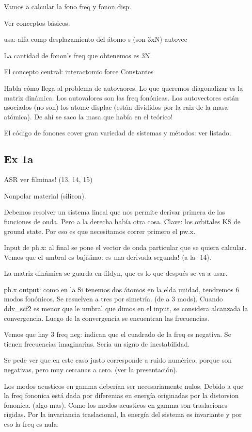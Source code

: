     Vamos a calcular la fono freq y fonon disp.

    Ver conceptos básicos.

    usa: alfa comp desplazamiento del átomo s (son 3xN) autovec

    La cantidad de fonon's freq que obtenemos es 3N.

    El concepto central: interactomic force Constantes

    Habla cómo llega al problema de autovaores. Lo que queremos diagonalizar es la matriz dinámica. Los autovalores son las freq fonónicas. Los autovectores están asociados (no son) los atomc displac (están divididos por la raiz de la masa atómica). De ahí se saco la masa que había en el teórico!

    El código de fonones cover gran variedad de sistemas y métodos: ver listado.

\subsection{Ex 1a}

  ASR ver filminas! (13, 14, 15)


  Nonpolar material (silicon).

  Debemos resolver un sistema lineal que nos permite derivar primera de las funciones de onda. Pero a la derecha había otra cosa. Clave: los orbitales KS de ground state. Por eso es que necesitamos correr primero el pw.x.

  Input de ph.x: al final se pone el vector de onda particular que se quiera calcular. Vemos que el umbral es bajísimo: es una derivada segunda! (a la -14).

  La matriz dinámica se guarda en fildyn, que es lo que después se va a usar.

  ph.x output: como en la Si tenemos dos átomos en la elda unidad, tendremos 6 modos fonónicos. Se resuelven a tres por simetría. (de a 3 mods). Cuando ddv\_scf\^2 es menor que le umbral que dimos en el input, se considera alcanzada la convergencia. Luego de la convergencia se encuentran las frecuencias.

  Vemos que hay 3 freq neg: indican que el cuadrado de la freq es negativa. Se tienen frecuencias imaginarias. Sería un signo de inestabilidad.

  Se pede ver que en este caso justo corresponde a ruido numérico, porque son negativas, pero muy cercanas a cero. (ver la presentación).

  Los modos acusticos en gamma deberían ser necesariamente nulos. Debido a que la freq fononica está dada por diferenias en energía originadas por la distorsion fononica. (algo mas). Como los modos acusticos en gamma son traslaciones rígidas. Por la invariancia traslacional, la energía del sistema es invariante y por eso la freq es nula.

